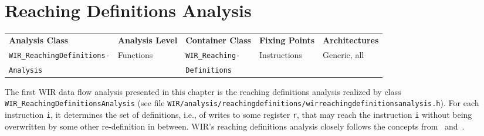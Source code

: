 \section{Reaching Definitions Analysis}
\label{sec:reachdef}

\begin{tabular}{|l|l|l|l|l|}
  \hline
  \textbf{Analysis Class} & \textbf{Analysis Level} & \textbf{Container Class} & \textbf{Fixing Points} & \textbf{Architectures} \\
  \hhline{|=|=|=|=|=|}
  \texttt{\small WIR\_ReachingDefinitions-} & Functions & \texttt{\small WIR\_Reaching-} & Instructions & Generic, all \\
  \texttt{\small Analysis} & & \texttt{\small Definitions} & & \\
  \hline
\end{tabular}

The first \gls{WIR} data flow analysis presented in this chapter is the reaching definitions analysis realized by class \texttt{WIR\_ReachingDefinitionsAnalysis} (see file \texttt{WIR/analysis/reachingdefinitions/wirreachingdefi\-nitionsanalysis.h}).
For each instruction \texttt{i}, it determines the set of definitions, i.e., of writes to some register \texttt{r}, that may reach the instruction \texttt{i} without being overwritten by some other re-definition in between.
\gls{WIR}'s reaching definitions analysis closely follows the concepts from~\cite[chapter~17.2]{Appel04} and~\cite[chapter~8.1]{Much97}.

